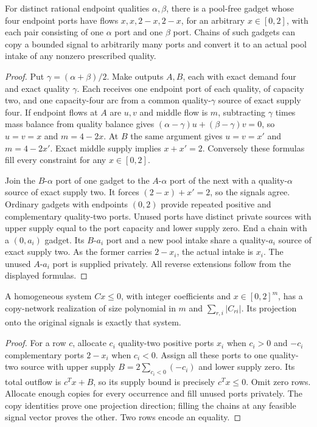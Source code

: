 \begin{lemma}\label{s3:copy-lemma}
For distinct rational endpoint qualities $\alpha,\beta$, there is a
pool-free gadget whose four endpoint ports have flows
$x,x,2-x,2-x$, for an arbitrary $x\in[0,2]$, with each pair consisting
of one $\alpha$ port and one $\beta$ port. Chains of such gadgets can
copy a bounded signal to arbitrarily many ports and convert it to an
actual pool intake of any nonzero prescribed quality.
\end{lemma}
\begin{proof}
Put $\gamma=(\alpha+\beta)/2$. Make outputs $A,B$, each with exact
demand four and exact quality $\gamma$. Each receives one endpoint
port of each quality, of capacity two, and one capacity-four arc from a
common quality-$\gamma$ source of exact supply four. If endpoint flows
at $A$ are $u,v$ and middle flow is $m$, subtracting $\gamma$ times
mass balance from quality balance gives
$(\alpha-\gamma)u+(\beta-\gamma)v=0$, so $u=v=x$ and $m=4-2x$.
At $B$ the same argument gives $u=v=x'$ and $m=4-2x'$. Exact middle
supply implies $x+x'=2$. Conversely these formulas fill every constraint
for any $x\in[0,2]$.

Join the $B$-$\alpha$ port of one gadget to the $A$-$\alpha$ port of
the next with a quality-$\alpha$ source of exact supply two. It forces
$(2-x)+x'=2$, so the signals agree. Ordinary gadgets with endpoints
$(0,2)$ provide repeated positive and complementary quality-two ports.
Unused ports have distinct private sources with upper supply equal to
the port capacity and lower supply zero. End a chain with a $(0,a_i)$
gadget. Its $B$-$a_i$ port and a new pool intake share a quality-$a_i$
source of exact supply two. As the former carries $2-x_i$, the actual
intake is $x_i$. The unused $A$-$a_i$ port is supplied privately.
All reverse extensions follow from the displayed formulas.
\end{proof}

\begin{lemma}\label{s3:row-copy}
A homogeneous system $Cx\le0$, with integer coefficients and
$x\in[0,2]^m$, has a copy-network realization of size polynomial in
$m$ and $\sum_{r,i}|C_{ri}|$. Its projection onto the original signals
is exactly that system.
\end{lemma}
\begin{proof}
For a row $c$, allocate $c_i$ quality-two positive ports $x_i$ when
$c_i>0$ and $-c_i$ complementary ports $2-x_i$ when $c_i<0$.
Assign all these ports to one quality-two source with upper supply
$B=2\sum_{c_i<0}(-c_i)$ and lower supply zero. Its total outflow is
$c^Tx+B$, so its supply bound is precisely $c^Tx\le0$. Omit zero rows.
Allocate enough copies for every occurrence and fill unused ports
privately. The copy identities prove one projection direction; filling
the chains at any feasible signal vector proves the other. Two rows
encode an equality.
\end{proof}

